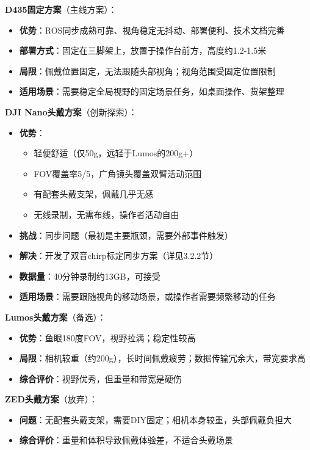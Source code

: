 \textbf{D435固定方案}（主线方案）：
\begin{itemize}[leftmargin=2em]
    \item \textbf{优势}：ROS同步成熟可靠、视角稳定无抖动、部署便利、技术文档完善
    \item \textbf{部署方式}：固定在三脚架上，放置于操作台前方，高度约1.2-1.5米
    \item \textbf{局限}：佩戴位置固定，无法跟随头部视角；视角范围受固定位置限制
    \item \textbf{适用场景}：需要稳定全局视野的固定场景任务，如桌面操作、货架整理
\end{itemize}

\textbf{DJI Nano头戴方案}（创新探索）：
\begin{itemize}[leftmargin=2em]
    \item \textbf{优势}：
    \begin{itemize}
        \item 轻便舒适（仅50g，远轻于Lumos的200g+）
        \item FOV覆盖率5/5，广角镜头覆盖双臂活动范围
        \item 有配套头戴支架，佩戴几乎无感
        \item 无线录制，无需布线，操作者活动自由
    \end{itemize}
    \item \textbf{挑战}：同步问题（最初是主要瓶颈，需要外部事件触发）
    \item \textbf{解决}：开发了双音chirp标定同步方案（详见3.2.2节）
    \item \textbf{数据量}：40分钟录制约13GB，可接受
    \item \textbf{适用场景}：需要跟随视角的移动场景，或操作者需要频繁移动的任务
\end{itemize}

\textbf{Lumos头戴方案}（备选）：
\begin{itemize}[leftmargin=2em]
    \item \textbf{优势}：鱼眼180度FOV，视野拉满；稳定性较高
    \item \textbf{局限}：相机较重（约200g），长时间佩戴疲劳；数据传输冗余大，带宽要求高
    \item \textbf{综合评价}：视野优秀，但重量和带宽是硬伤
\end{itemize}

\textbf{ZED头戴方案}（放弃）：
\begin{itemize}[leftmargin=2em]
    \item \textbf{问题}：无配套头戴支架，需要DIY固定；相机本身较重，头部佩戴负担大
    \item \textbf{综合评价}：重量和体积导致佩戴体验差，不适合头戴场景
\end{itemize}

